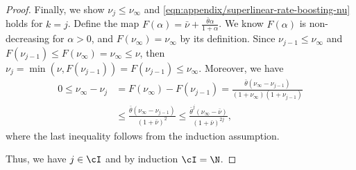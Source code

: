 \begin{proof}
    Finally, we show $\nu_j \leq \nu_\infty$ and \eqref{eqn:appendix/superlinear-rate-boosting-nu} holds for $k=j$. 
    Define the map $F(\alpha) = \bar\nu + \frac{\bar\theta\alpha}{1 + \alpha}$.
    We know $F(\alpha)$ is non-decreasing for $\alpha > 0$,
    and $F(\nu_\infty) = \nu_\infty$ by its definition.
    Since  $\nu_{j-1} \leq \nu_\infty$ 
    and $F(\nu_{j-1}) \leq F(\nu_\infty) = \nu_\infty \leq \nu$, 
    then
    $\nu_j = \min(\nu, F(\nu_{j-1})) = F(\nu_{j-1})
   \leq \nu_\infty$.
    Moreover,  we have
    \begin{align*}
        0 \leq \nu_\infty - \nu_j
        &= F(\nu_\infty) - F(\nu_{j-1})
        = \frac{\bar\theta(\nu_\infty-\nu_{j-1})}{(1+\nu_\infty)(1 + \nu_{j-1})} \\
        &\leq \frac{\bar\theta(\nu_\infty-\nu_{j-1})}{(1+\bar \nu)^2}
        \leq \frac{\bar\theta^j(\nu_\infty-\bar\nu)}{(1+\bar \nu)^{2j}}
        ,
    \end{align*}
    where the last inequality follows from the induction assumption.

    
    Thus, we have $j \in \cI$ and by induction $\cI = \N$.
\end{proof}



